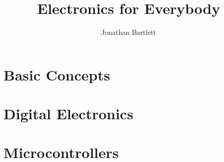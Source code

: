 \documentclass{book}
\begin{document}
\sloppy

\frontmatter

\title{Electronics for Everybody}
\author{Jonathan Bartlett}



\tableofcontents

\mainmatter










\part{Basic Concepts}









\part{Digital Electronics}






\part{Microcontrollers}
\end{document}
